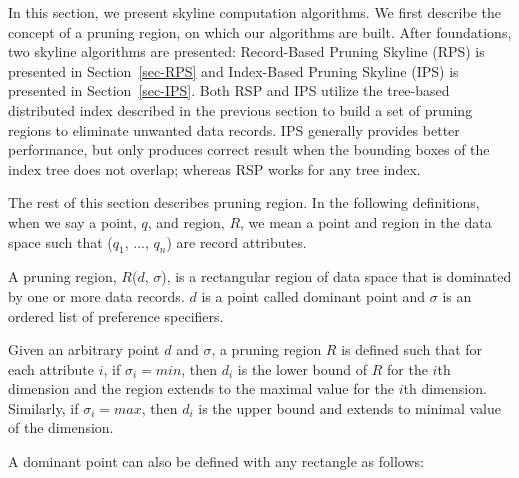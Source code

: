 In this section, we present skyline computation algorithms. We first describe the concept of a pruning region, on which our algorithms are built. After foundations, two skyline algorithms are presented: Record-Based Pruning Skyline (RPS) is presented in Section~\ref{sec-RPS} and Index-Based Pruning Skyline (IPS) is presented in Section~\ref{sec-IPS}. Both RSP and IPS utilize the tree-based distributed index described in the previous section to build a set of pruning regions to eliminate unwanted data records. IPS generally provides better performance, but only produces correct result when the bounding boxes of the index tree does not overlap; whereas RSP works for any tree index.

The rest of this section describes pruning region. In the following definitions, when we say a point, $q$, and region, $R$, we mean a point and region in the data space such that ($q_1$, ..., $q_n$) are record attributes.



\begin{definition}
A pruning region, $R$($d$, $\sigma$), is a rectangular region of data space that is dominated by one or more data records. $d$ is a point called dominant point and $\sigma$ is an ordered list of preference specifiers.
\end{definition}

Given an arbitrary point $d$ and $\sigma$, a pruning region $R$ is defined such that for each attribute $i$, if $\sigma_i = min$, then $d_i$ is the lower bound of $R$ for the $i$th dimension and the region extends to the maximal value for the $i$th dimension. Similarly, if $\sigma_i = max$, then $d_i$ is the upper bound and extends to minimal value of the dimension.

A dominant point can also be defined with any rectangle as follows:

